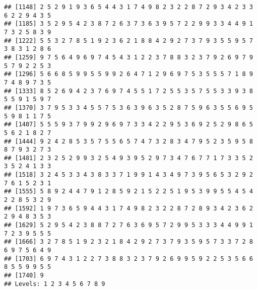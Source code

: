 \documentclass[
]{article}
\newenvironment{Shaded}{\begin{snugshade}}{\end{snugshade}}
\newcommand{\AttributeTok}[1]{\textcolor[rgb]{0.77,0.63,0.00}{#1}}
\newcommand{\CommentTok}[1]{\textcolor[rgb]{0.56,0.35,0.01}{\textit{#1}}}
\newcommand{\FunctionTok}[1]{\textcolor[rgb]{0.00,0.00,0.00}{#1}}
\newcommand{\NormalTok}[1]{#1}
\newcommand{\OtherTok}[1]{\textcolor[rgb]{0.56,0.35,0.01}{#1}}
\newcommand{\SpecialCharTok}[1]{\textcolor[rgb]{0.00,0.00,0.00}{#1}}
\newcommand{\StringTok}[1]{\textcolor[rgb]{0.31,0.60,0.02}{#1}}
\begin{document}
\begin{verbatim}
## [1148] 2 5 2 9 1 9 3 6 5 4 4 3 1 7 4 9 8 2 3 2 2 8 7 2 9 3 4 2 3 3 6 2 2 9 4 3 5
## [1185] 3 5 2 9 5 4 2 3 8 7 2 6 3 7 3 6 3 9 5 7 2 2 9 9 3 3 4 4 9 1 7 3 2 5 8 3 9
## [1222] 5 5 3 2 7 8 5 1 9 2 3 6 2 1 8 8 4 2 9 2 7 3 7 9 3 5 5 9 5 7 3 8 3 1 2 8 6
## [1259] 9 7 5 6 4 9 6 9 7 4 5 4 3 1 2 2 3 7 8 8 3 2 3 7 9 2 6 9 7 9 5 7 9 2 2 5 3
## [1296] 5 6 6 8 5 9 9 5 5 9 9 2 6 4 7 1 2 9 6 9 7 5 3 5 5 5 7 1 8 9 7 4 8 9 7 3 5
## [1333] 8 5 2 6 9 4 2 3 7 6 9 7 4 5 5 1 7 2 5 5 3 5 7 5 5 3 3 9 3 8 5 5 9 1 5 9 7
## [1370] 3 7 9 5 3 3 4 5 5 7 5 3 6 3 9 6 3 5 2 8 7 5 9 6 3 5 5 6 9 5 5 9 8 1 1 7 5
## [1407] 5 5 5 9 3 7 9 9 2 9 6 9 7 3 3 4 2 2 9 5 3 6 9 2 5 2 9 8 6 5 5 6 2 1 8 2 7
## [1444] 9 2 4 2 8 5 3 5 7 5 5 6 5 7 4 7 3 2 8 3 4 7 9 5 2 3 5 9 5 8 8 7 9 3 2 7 3
## [1481] 2 3 2 5 2 9 9 3 2 5 4 9 3 9 5 2 9 7 3 4 7 6 7 7 1 7 3 3 5 2 3 5 2 4 1 3 3
## [1518] 3 2 4 5 3 3 4 3 8 3 3 7 1 9 9 1 4 3 4 9 7 3 9 5 6 5 3 2 9 2 7 6 1 5 2 3 1
## [1555] 5 8 9 2 4 4 7 9 1 2 8 5 9 2 1 5 2 2 5 1 9 5 3 9 9 5 5 4 5 4 2 2 8 5 3 2 9
## [1592] 1 9 7 3 6 5 9 4 4 3 1 7 4 9 8 2 3 2 2 8 7 2 8 9 3 4 2 3 6 2 2 9 4 8 3 5 3
## [1629] 5 2 9 5 4 2 3 8 8 7 2 7 6 3 6 9 5 7 2 9 9 5 3 3 3 4 4 9 9 1 7 2 3 9 5 5 5
## [1666] 3 2 7 8 5 1 9 2 3 2 1 8 4 2 9 2 7 3 7 9 3 5 9 5 7 3 3 7 2 8 6 9 7 5 6 4 9
## [1703] 6 9 7 4 3 1 2 2 7 3 8 8 3 2 3 7 9 2 6 9 9 5 9 2 2 5 3 5 6 6 8 5 5 9 9 5 5
## [1740] 9
## Levels: 1 2 3 4 5 6 7 8 9
\end{verbatim}

\begin{Shaded}
\end{Shaded}
\end{document}
